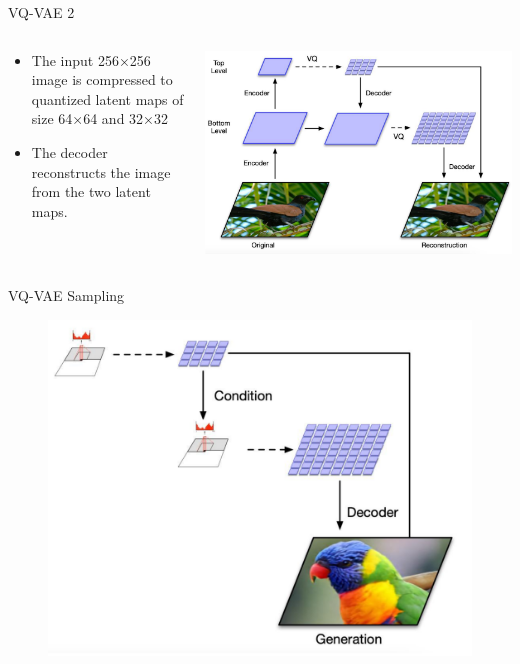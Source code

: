 \begin{frame}{VQ-VAE 2}
    \begin{columns}
\begin{column}{0.3\textwidth}
   \begin{itemize}
       \item The input 256×256 image is compressed to quantized latent maps of size 64×64 and 32×32
       \item The decoder reconstructs the image from the two latent maps.
   \end{itemize}
\end{column}
\begin{column}{0.7\textwidth}  %
    \begin{center}
     \includegraphics[height=0.9\textheight, width=\textwidth, keepaspectratio]{images/vae/vqvae2.PNG}
     \end{center}
\end{column}
\end{columns}
\end{frame}

\begin{frame}[allowframebreaks]{VQ-VAE Sampling}
\begin{figure}
        \centering
        \includegraphics[height=0.9\textheight, width=\textwidth, keepaspectratio]{images/vae/vqvae2_sampling.PNG}
\end{figure}
\end{frame}

